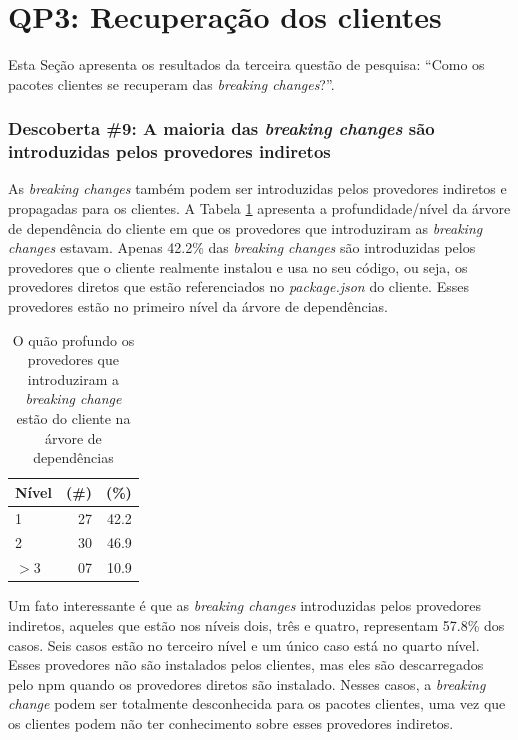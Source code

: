 
\section{QP3: Recuperação dos clientes}
\label{sec:qp3:results}

Esta Seção apresenta os resultados da terceira questão de pesquisa: ``Como os pacotes clientes se recuperam das \textit{breaking changes}?''.

\subsubsection{Descoberta \#9: A maioria das \textit{breaking changes} são introduzidas pelos provedores indiretos}

As \textit{breaking changes} também podem ser introduzidas pelos provedores indiretos e propagadas para os clientes. A Tabela \ref{tab:dependency_tree_deep} apresenta a profundidade/nível da árvore de dependência do cliente em que os provedores que introduziram as \textit{breaking changes} estavam. Apenas 42.2\% das \textit{breaking changes} são introduzidas pelos provedores que o cliente realmente instalou e usa no seu código, ou seja, os provedores diretos que estão referenciados no \textit{package.json} do cliente. Esses provedores estão no primeiro nível da árvore de dependências.

\begin{table}
	\centering
	\caption{O quão profundo os provedores que introduziram a \textit{breaking change} estão do cliente na árvore de dependências}
	\begin{tabular}{lrr}
		\toprule
		\textbf{Nível} & \textbf{(\#)} & \textbf{(\%)} \\ \hline
		1              & 27            & 42.2          \\
		2              & 30            & 46.9          \\
		$>$3           & 07            & 10.9          \\ \bottomrule
	\end{tabular}
	\label{tab:dependency_tree_deep}
\end{table}

Um fato interessante é que as \textit{breaking changes} introduzidas pelos provedores indiretos, aqueles que estão nos níveis dois, três e quatro, representam 57.8\% dos casos. Seis casos estão no terceiro nível e um único caso está no quarto nível. Esses provedores não são instalados pelos clientes, mas eles são descarregados pelo \textsf{npm} quando os provedores diretos são instalado. Nesses casos, a \textit{breaking change} podem ser totalmente desconhecida para os pacotes clientes, uma vez que os clientes podem não ter conhecimento sobre esses provedores indiretos.

